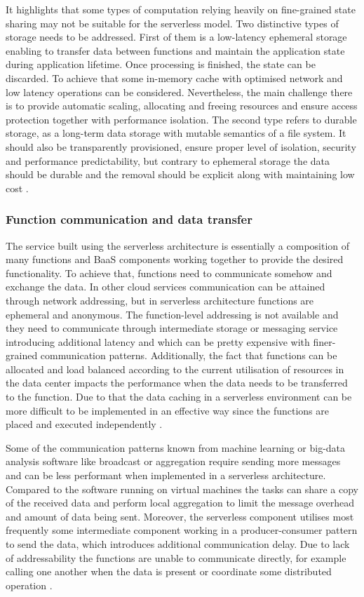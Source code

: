 It highlights that some types of computation relying heavily on fine-grained state sharing may not be suitable for the serverless model. Two distinctive types of storage needs to be addressed. First of them is a low-latency ephemeral storage enabling to transfer data between functions and maintain the application state during application lifetime. Once processing is finished, the state can be discarded. To achieve that some in-memory cache with optimised network and low latency operations can be considered. Nevertheless, the main challenge there is to provide automatic scaling, allocating and freeing resources and ensure access protection together with performance isolation. The second type refers to durable storage, as a long-term data storage with mutable semantics of a file system. It should also be transparently provisioned, ensure proper level of isolation, security and performance predictability, but contrary to ephemeral storage the data should be durable and the removal should be explicit along with maintaining low cost \cite{BerkeleyServerless}.

\subsubsection*{Function communication and data transfer}

The service built using the serverless architecture is essentially a composition of many functions and BaaS components working together to provide the desired functionality. To achieve that, functions need to communicate somehow  and exchange the data. In other cloud services communication can be attained through network addressing, but in serverless architecture functions are ephemeral and anonymous. The function-level addressing is not available and they need to communicate through intermediate storage or messaging service introducing additional latency and which can be pretty expensive with finer-grained communication patterns. Additionally, the fact that functions can be allocated and load balanced according to the current utilisation of resources in the data center impacts the performance when the data needs to be transferred to the function. Due to that the data caching in a serverless environment can be more difficult to be implemented in an effective way since the functions are placed and executed independently \cite{ServerlessComputingSurveyOfOpportunitiesChallengesApplications}.

Some of the communication patterns known from machine learning or big-data analysis software like broadcast or aggregation require sending more messages and can be less performant when implemented in a serverless architecture. Compared to the software running on virtual machines the tasks can share a copy of the received data and perform local aggregation to limit the message overhead and amount of data being sent. Moreover, the serverless component utilises most frequently some intermediate component working in a producer-consumer pattern to send the data, which introduces additional communication delay. Due to lack of addressability the functions are unable to communicate directly, for example calling one another when the data is present or coordinate some distributed operation \cite{BerkeleyServerless}.

